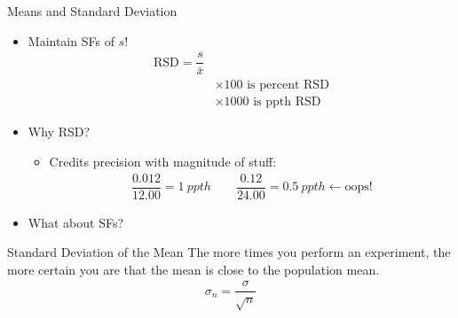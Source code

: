 \documentclass[notes=hide]{beamer}
\begin{document}
\begin{frame}{Means and Standard Deviation}
{	\begin{itemize}
		\item Maintain SFs of $s$!
			\begin{align*}
				\text{RSD} = \dfrac{s}{\bar{x}} & \\
				&\times 100 \text{ is percent RSD} \\
				&\times 1000 \text{ is ppth RSD}
			\end{align*}
		\item Why RSD?
			\begin{itemize}
				\item Credits precision with magnitude of stuff:
					\begin{align*}
						\dfrac{0.012}{12.00} = \SI{1}{ppth}
						\qquad
						\dfrac{0.12}{24.00} = \SI{0.5}{ppth} \leftarrow{} \text{oops!}
					\end{align*}
			\end{itemize}
		\item What about SFs?
	\end{itemize}
}
\end{frame}

\begin{frame}[t]{Standard Deviation of the Mean}
	The more times you perform an experiment, the more certain you are that
	the mean is close to the population mean.
	\begin{align*}
		\sigma_n = \dfrac{\sigma}{\sqrt{n}}
	\end{align*}

%
%	
\end{frame}


\end{document}
